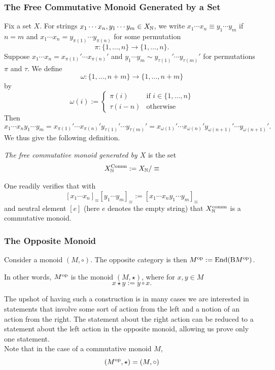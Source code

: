 \subsubsection{The Free Commutative Monoid Generated by a Set}
Fix a set $X$. For strings $ x_1\cdots x_n, y_1\cdots y_m \in X_{\mathbb{N}}$, we write $x_1\cdots x_n \equiv y_1\cdots y_m$ if $n=m$ and $x_1\cdots x_n = y_{\pi(1)}\cdots y_{\pi(n)}$ for some permutation 
$$
    \pi : \{1,\dots,n\}\rightarrow \{1,\dots,n\}.
$$
Suppose $x_1\cdots x_n = x_{\pi(1)}'\cdots x_{\pi(n)}'$ and $y_1\cdots y_m \sim y_{\tau(1)}' \cdots y_{\tau(m)}'$ for permutations $\pi$ and $\tau$. We define 
$$
    \omega : \{1,\dots,n+m\} \rightarrow \{1,\dots,n+m\}
$$
by 
$$
    \omega(i) := 
    \begin{cases}
        \pi(i) & \text{if } i\in \{1,\dots,n\}\\
        \tau(i-n) & \text{otherwise}
    \end{cases}
$$
Then 
$$
    x_1\cdots x_ny_1\cdots y_m = x_{\pi(1)}'\cdots x_{\pi(n)}'y_{\tau(1)}'\cdots y_{\tau(m)}' = x_{\omega(1)}'\cdots x_{\omega(n)}'y_{\omega(n+1)}'\cdots y_{\omega(n+1)}'.
$$
We thus give the following definition. 
\begin{definition}
    \emph{The free commutative monoid generated by $X$} is the set 
    $$
        X_{\mathbb{N}}^\mathrm{Comm} := X_{\mathbb{N}}/\equiv
    $$
\end{definition}
One readily verifies that with 
$$
    [x_1\cdots x_n]_\equiv [y_1\cdots y_m]_\equiv := [x_1\cdots x_n y_1\cdots y_m]_\equiv
$$
and neutral element $[e]$ (here $e$ denotes the empty string) that $X_{\mathbb{N}}^\mathrm{comm}$ is a commutative monoid. 
\subsubsection{The Opposite Monoid}
    \begin{definition}
        Consider a monoid $(M,\circ)$. The opposite category is then $M^\mathrm{op}:=\mathrm{End}(\mathrm{B}M^\mathrm{op})$.
    \end{definition}
    \begin{remark}
        In other words, $M^\mathrm{op}$ is the monoid $(M,\star)$, where for $x,y\in M$
        $$
            x\star y:= y\circ x.
        $$
    \end{remark}
    The upshot of having such a construction is in many cases we are interested in statements that involve some sort of action from the left and a notion of an action from the right. The statement about the right action can be reduced to a statement about the left action in the opposite monoid, allowing us prove only one statement.\\
    Note that in the case of a commutative monoid $M$, 
    $$
        (M^\mathrm{op},\star) = (M,\circ)
    $$
